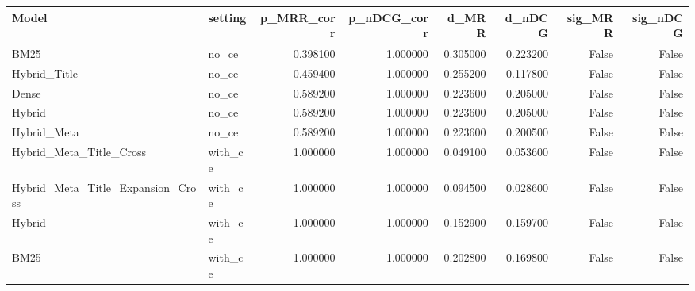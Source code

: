 \begin{tabular}{llrrrrrr}
\toprule
Model & setting & p_MRR_corr & p_nDCG_corr & d_MRR & d_nDCG & sig_MRR & sig_nDCG \\
\midrule
BM25 & no_ce & 0.398100 & 1.000000 & 0.305000 & 0.223200 & False & False \\
Hybrid_Title & no_ce & 0.459400 & 1.000000 & -0.255200 & -0.117800 & False & False \\
Dense & no_ce & 0.589200 & 1.000000 & 0.223600 & 0.205000 & False & False \\
Hybrid & no_ce & 0.589200 & 1.000000 & 0.223600 & 0.205000 & False & False \\
Hybrid_Meta & no_ce & 0.589200 & 1.000000 & 0.223600 & 0.200500 & False & False \\
Hybrid_Meta_Title_Cross & with_ce & 1.000000 & 1.000000 & 0.049100 & 0.053600 & False & False \\
Hybrid_Meta_Title_Expansion_Cross & with_ce & 1.000000 & 1.000000 & 0.094500 & 0.028600 & False & False \\
Hybrid & with_ce & 1.000000 & 1.000000 & 0.152900 & 0.159700 & False & False \\
BM25 & with_ce & 1.000000 & 1.000000 & 0.202800 & 0.169800 & False & False \\
\bottomrule
\end{tabular}
